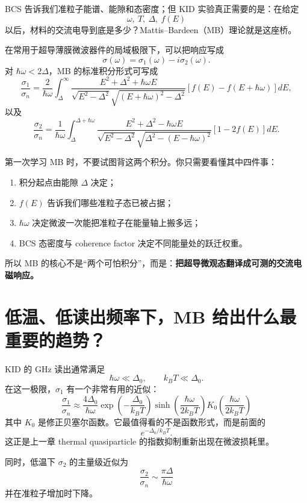 \documentclass[11pt,a4paper,openany]{ctexrep}
\begin{document}
BCS 告诉我们准粒子能谱、能隙和态密度；但 KID 实验真正需要的是：在给定
\[
\omega,\ T,\ \Delta,\ f(E)
\]
以后，材料的交流电导到底是多少？Mattis--Bardeen（MB）理论就是这座桥。

在常用于超导薄膜微波器件的局域极限下，可以把响应写成
\[
\boxed{
\sigma(\omega)=\sigma_1(\omega)-i\sigma_2(\omega).
}
\]
对 $\hbar\omega<2\Delta$，MB 的标准积分形式可写成
\[
\frac{\sigma_1}{\sigma_n}
=
\frac{2}{\hbar\omega}
\int_{\Delta}^{\infty}
\frac{E^2+\Delta^2+\hbar\omega E}
{\sqrt{E^2-\Delta^2}\sqrt{(E+\hbar\omega)^2-\Delta^2}}
\left[f(E)-f(E+\hbar\omega)\right]dE,
\]
以及
\[
\frac{\sigma_2}{\sigma_n}
=
\frac{1}{\hbar\omega}
\int_{\Delta}^{\Delta+\hbar\omega}
\frac{E^2+\Delta^2-\hbar\omega E}
{\sqrt{E^2-\Delta^2}\sqrt{\Delta^2-(E-\hbar\omega)^2}}
\left[1-2f(E)\right]dE.
\]

\begin{intuitionbox}
第一次学习 MB 时，不要试图背这两个积分。你只需要看懂其中四件事：
\begin{enumerate}
  \item 积分起点由能隙 $\Delta$ 决定；
  \item $f(E)$ 告诉我们哪些准粒子态已被占据；
  \item $\hbar\omega$ 决定微波一次能把准粒子在能量轴上搬多远；
  \item BCS 态密度与 coherence factor 决定不同能量处的跃迁权重。
\end{enumerate}
所以 MB 的核心不是“两个可怕积分”，而是：\textbf{把超导微观态翻译成可测的交流电磁响应。}
\end{intuitionbox}

\section{低温、低读出频率下，MB 给出什么最重要的趋势？}

KID 的 GHz 读出通常满足
\[
\hbar\omega\ll\Delta_0,
\qquad
k_BT\ll\Delta_0.
\]
在这一极限，$\sigma_1$ 有一个非常有用的近似：
\[
\boxed{
\frac{\sigma_1}{\sigma_n}
\approx
\frac{4\Delta_0}{\hbar\omega}
\exp\!\left(-\frac{\Delta_0}{k_BT}\right)
\sinh\!\left(\frac{\hbar\omega}{2k_BT}\right)
K_0\!\left(\frac{\hbar\omega}{2k_BT}\right)
}
\]
其中 $K_0$ 是修正贝塞尔函数。它最值得看的不是函数形式，而是前面的
\[
\boxed{e^{-\Delta_0/k_BT}}.
\]
这正是上一章 thermal quasiparticle 的指数抑制重新出现在微波损耗里。

同时，低温下 $\sigma_2$ 的主量级近似为
\[
\boxed{
\frac{\sigma_2}{\sigma_n}\sim\frac{\pi\Delta}{\hbar\omega}
}
\]
并在准粒子增加时下降。
\end{document}
